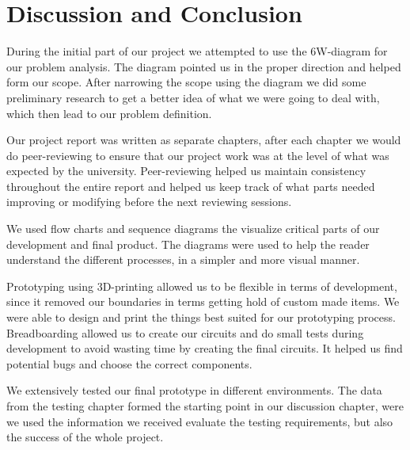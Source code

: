 \section{Discussion and Conclusion}

During the initial part of our project we attempted to use the 6W-diagram for our problem analysis. The diagram pointed us in the proper direction and helped form our scope. After narrowing the scope using the diagram we did some preliminary research to get a better idea of what we were going to deal with, which then lead to our problem definition.

Our project report was written as separate chapters, after each chapter we would do peer-reviewing to ensure that our project work was at the level of what was expected by the university. Peer-reviewing helped us maintain consistency throughout the entire report and helped us keep track of what parts needed improving or modifying before the next reviewing sessions.

We used flow charts and sequence diagrams the visualize critical parts of our development and final product. The diagrams were used to help the reader understand the different processes, in a simpler and more visual manner. 

Prototyping using 3D-printing allowed us to be flexible in terms of development, since it removed our boundaries in terms getting hold of custom made items. We were able to design and print the things best suited for our prototyping process. Breadboarding allowed us to create our circuits and do small tests during development to avoid wasting time by creating the final circuits. It helped us find potential bugs and choose the correct components.

We extensively tested our final prototype in different environments. The data from the testing chapter formed the starting point in our discussion chapter, were we used the information we received evaluate the testing requirements, but also the success of the whole project.
